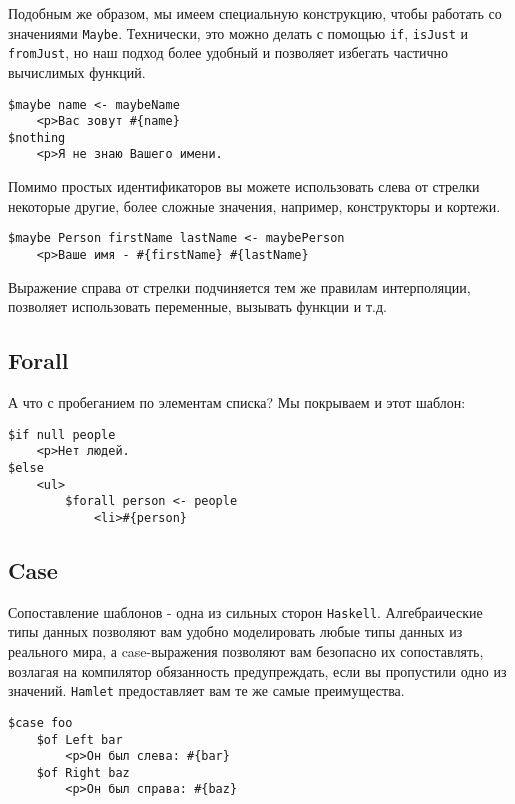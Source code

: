 Подобным же образом, мы имеем специальную конструкцию, чтобы работать
со значениями \lstinline!Maybe!. Технически, это можно делать с помощью \texttt{if},
\texttt{isJust} и \texttt{fromJust}, но наш подход более удобный и позволяет
избегать частично вычислимых функций.

\begin{lstlisting}
$maybe name <- maybeName
    <p>Ваc зовут #{name}
$nothing
    <p>Я не знаю Вашего имени.
\end{lstlisting}

Помимо простых идентификаторов вы можете использовать слева от стрелки некоторые другие,
более сложные значения, например, конструкторы и кортежи.

\begin{lstlisting}
$maybe Person firstName lastName <- maybePerson
    <p>Ваше имя - #{firstName} #{lastName}
\end{lstlisting}

Выражение справа от стрелки подчиняется тем же правилам интерполяции,
позволяет использовать переменные, вызывать функции и т.д.

\subsection{Forall}

А что с пробеганием по элементам списка? Мы покрываем и этот шаблон:

\begin{lstlisting}
$if null people
    <p>Нет людей.
$else
    <ul>
        $forall person <- people
            <li>#{person}
\end{lstlisting}


\subsection{Case}

Сопоставление шаблонов - одна из сильных сторон \texttt{Haskell}. Алгебраические типы данных
позволяют вам удобно моделировать любые типы данных из реального мира, а
case-выражения позволяют вам безопасно их сопоставлять, возлагая на компилятор
обязанность предупреждать, если вы пропустили одно из значений.
\texttt{Hamlet} предоставляет вам те же самые преимущества.

\begin{lstlisting}
$case foo
    $of Left bar
        <p>Он был слева: #{bar}
    $of Right baz
        <p>Он был справа: #{baz}
\end{lstlisting}

